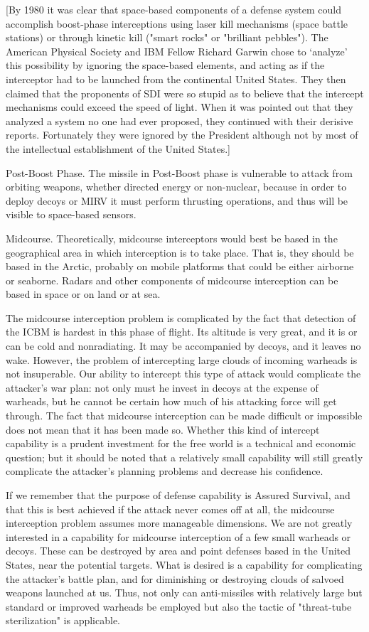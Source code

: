 [By 1980 it was clear that space-based components of a defense system could accomplish boost-phase interceptions using laser kill mechanisms (space battle stations) or through kinetic kill ("smart rocks" or "brilliant pebbles"). The American Physical Society and IBM Fellow Richard Garwin chose to ‘analyze’ this possibility by ignoring the space-based elements, and acting as if the interceptor had to be launched from the continental United States. They then claimed that the proponents of SDI were so stupid as to believe that the intercept mechanisms could exceed the speed of light. When it was pointed out that they analyzed a system no one had ever proposed, they continued with their derisive reports. Fortunately they were ignored by the President although not by most of the intellectual establishment of the United States.]

Post-Boost Phase. The missile in Post-Boost phase is vulnerable to attack from orbiting weapons, whether directed energy or non-nuclear, because in order to deploy decoys or MIRV it must perform thrusting operations, and thus will be visible to space-based sensors.

Midcourse. Theoretically, midcourse interceptors would best be based in the geographical area in which interception is to take place. That is, they should be based in the Arctic, probably on mobile platforms that could be either airborne or seaborne. Radars and other components of midcourse interception can be based in space or on land or at sea.

The midcourse interception problem is complicated by the fact that detection of the ICBM is hardest in this phase of flight. Its altitude is very great, and it is or can be cold and nonradiating. It may be accompanied by decoys, and it leaves no wake. However, the problem of intercepting large clouds of incoming warheads is not insuperable. Our ability to intercept this type of attack would complicate the attacker's war plan: not only must he invest in decoys at the expense of warheads, but he cannot be certain how much of his attacking force will get through. The fact that midcourse interception can be made difficult or impossible does not mean that it has been made so. Whether this kind of intercept capability is a prudent investment for the free world is a technical and economic question; but it should be noted that a relatively small capability will still greatly complicate the attacker's planning problems and decrease his confidence.

If we remember that the purpose of defense capability is Assured Survival, and that this is best achieved if the attack never comes off at all, the midcourse interception problem assumes more manageable dimensions. We are not greatly interested in a capability for midcourse interception of a few small warheads or decoys. These can be destroyed by area and point defenses based in the United States, near the potential targets. What is desired is a capability for complicating the attacker's battle plan, and for diminishing or destroying clouds of salvoed weapons launched at us. Thus, not only can anti-missiles with relatively large but standard or improved warheads be employed but also the tactic of "threat-tube sterilization" is applicable.


